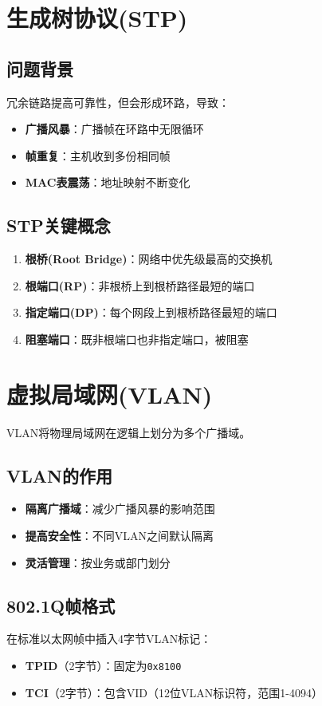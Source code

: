 \section{生成树协议(STP)}
\subsection{问题背景}
冗余链路提高可靠性，但会形成环路，导致：
\begin{itemize}[leftmargin=2em,itemsep=0pt]
    \item \textbf{广播风暴}：广播帧在环路中无限循环
    \item \textbf{帧重复}：主机收到多份相同帧
    \item \textbf{MAC表震荡}：地址映射不断变化
\end{itemize}

\subsection{STP关键概念}
\begin{enumerate}[leftmargin=2em,itemsep=0pt]
    \item \textbf{根桥(Root Bridge)}：网络中优先级最高的交换机
    \item \textbf{根端口(RP)}：非根桥上到根桥路径最短的端口
    \item \textbf{指定端口(DP)}：每个网段上到根桥路径最短的端口
    \item \textbf{阻塞端口}：既非根端口也非指定端口，被阻塞
\end{enumerate}

\section{虚拟局域网(VLAN)}
VLAN将物理局域网在逻辑上划分为多个广播域。

\subsection{VLAN的作用}
\begin{itemize}[leftmargin=2em,itemsep=0pt]
    \item \textbf{隔离广播域}：减少广播风暴的影响范围
    \item \textbf{提高安全性}：不同VLAN之间默认隔离
    \item \textbf{灵活管理}：按业务或部门划分
\end{itemize}

\subsection{802.1Q帧格式}
在标准以太网帧中插入4字节VLAN标记：
\begin{itemize}[leftmargin=2em,itemsep=0pt]
    \item \textbf{TPID}（2字节）：固定为\texttt{0x8100}
    \item \textbf{TCI}（2字节）：包含VID（12位VLAN标识符，范围1-4094）
\end{itemize}

